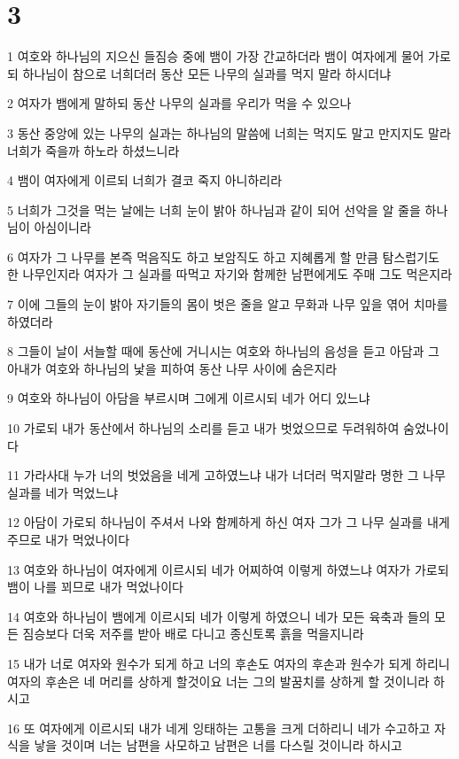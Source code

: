 \chapter{3}

\par 1 여호와 하나님의 지으신 들짐승 중에 뱀이 가장 간교하더라 뱀이 여자에게 물어 가로되 하나님이 참으로 너희더러 동산 모든 나무의 실과를 먹지 말라 하시더냐
\par 2 여자가 뱀에게 말하되 동산 나무의 실과를 우리가 먹을 수 있으나
\par 3 동산 중앙에 있는 나무의 실과는 하나님의 말씀에 너희는 먹지도 말고 만지지도 말라 너희가 죽을까 하노라 하셨느니라
\par 4 뱀이 여자에게 이르되 너희가 결코 죽지 아니하리라
\par 5 너희가 그것을 먹는 날에는 너희 눈이 밝아 하나님과 같이 되어 선악을 알 줄을 하나님이 아심이니라
\par 6 여자가 그 나무를 본즉 먹음직도 하고 보암직도 하고 지혜롭게 할 만큼 탐스럽기도 한 나무인지라 여자가 그 실과를 따먹고 자기와 함께한 남편에게도 주매 그도 먹은지라
\par 7 이에 그들의 눈이 밝아 자기들의 몸이 벗은 줄을 알고 무화과 나무 잎을 엮어 치마를 하였더라
\par 8 그들이 날이 서늘할 때에 동산에 거니시는 여호와 하나님의 음성을 듣고 아담과 그 아내가 여호와 하나님의 낯을 피하여 동산 나무 사이에 숨은지라
\par 9 여호와 하나님이 아담을 부르시며 그에게 이르시되 네가 어디 있느냐
\par 10 가로되 내가 동산에서 하나님의 소리를 듣고 내가 벗었으므로 두려워하여 숨었나이다
\par 11 가라사대 누가 너의 벗었음을 네게 고하였느냐 내가 너더러 먹지말라 명한 그 나무 실과를 네가 먹었느냐
\par 12 아담이 가로되 하나님이 주셔서 나와 함께하게 하신 여자 그가 그 나무 실과를 내게 주므로 내가 먹었나이다
\par 13 여호와 하나님이 여자에게 이르시되 네가 어찌하여 이렇게 하였느냐 여자가 가로되 뱀이 나를 꾀므로 내가 먹었나이다
\par 14 여호와 하나님이 뱀에게 이르시되 네가 이렇게 하였으니 네가 모든 육축과 들의 모든 짐승보다 더욱 저주를 받아 배로 다니고 종신토록 흙을 먹을지니라
\par 15 내가 너로 여자와 원수가 되게 하고 너의 후손도 여자의 후손과 원수가 되게 하리니 여자의 후손은 네 머리를 상하게 할것이요 너는 그의 발꿈치를 상하게 할 것이니라 하시고
\par 16 또 여자에게 이르시되 내가 네게 잉태하는 고통을 크게 더하리니 네가 수고하고 자식을 낳을 것이며 너는 남편을 사모하고 남편은 너를 다스릴 것이니라 하시고
